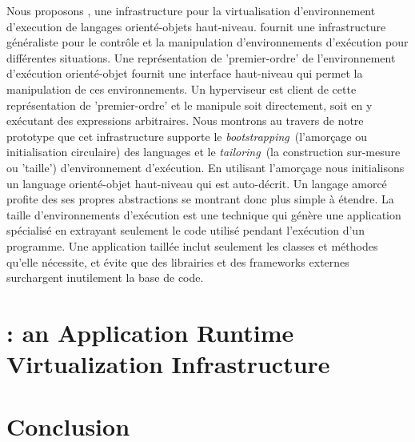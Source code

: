 \documentclass[a4paper,11pt,twoside]{include/ThesisStyle}
\begin{document}
Nous proposons \Vtt, une infrastructure pour la virtualisation d'environnement d'execution de langages orienté-objets haut-niveau. \Vtt fournit une infrastructure généraliste pour le contrôle et la manipulation d'environnements d'exécution pour différentes situations. Une représentation de 'premier-ordre' de l'environnement d'exécution orienté-objet fournit une interface haut-niveau qui permet la manipulation de ces environnements. Un hyperviseur est client de cette représentation de 'premier-ordre' et le manipule soit directement, soit en y exécutant des expressions arbitraires.
Nous montrons au travers de notre prototype que cet infrastructure supporte le \emph{bootstrapping}~(\ie l'amorçage ou initialisation circulaire) des languages et le \emph{tailoring}~(\ie la construction sur-mesure ou 'taille') d'environnement d'exécution. En utilisant l'amorçage nous initialisons un language orienté-objet haut-niveau qui est auto-décrit. Un langage amorcé profite des ses propres abstractions se montrant donc plus simple à étendre. La taille d'environnements d'exécution est une technique qui génère une application spécialisé en extrayant seulement le code utilisé pendant l'exécution d'un programme. Une application taillée inclut seulement les classes et méthodes qu'elle nécessite, et évite que des librairies et des frameworks externes surchargent inutilement la base de code.

\renewcommand{\baselinestretch}{1}\normalsize
\tableofcontents

\renewcommand{\baselinestretch}{1.2}\normalsize
\mainmatter
{}





\part{\VTT: an Application Runtime Virtualization Infrastructure}





%

\part{Conclusion}

\end{document}
